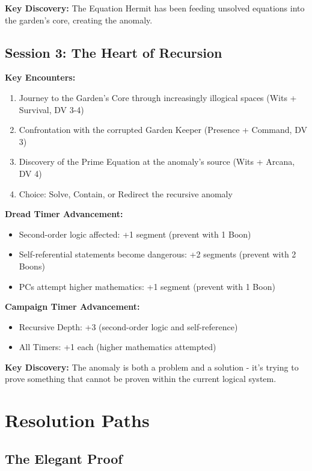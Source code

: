 \documentclass[11pt]{article}
\begin{document}
\textbf{Key Discovery:} The Equation Hermit has been feeding unsolved equations into the garden's core, creating the anomaly.

\subsection{Session 3: The Heart of Recursion}

\textbf{Key Encounters:}
\begin{enumerate}
\item Journey to the Garden's Core through increasingly illogical spaces (Wits + Survival, DV 3-4)
\item Confrontation with the corrupted Garden Keeper (Presence + Command, DV 3)
\item Discovery of the Prime Equation at the anomaly's source (Wits + Arcana, DV 4)
\item Choice: Solve, Contain, or Redirect the recursive anomaly
\end{enumerate}

\textbf{Dread Timer Advancement:}
\begin{itemize}
\item Second-order logic affected: +1 segment (prevent with 1 Boon)
\item Self-referential statements become dangerous: +2 segments (prevent with 2 Boons)
\item PCs attempt higher mathematics: +1 segment (prevent with 1 Boon)
\end{itemize}

\textbf{Campaign Timer Advancement:}
\begin{itemize}
\item Recursive Depth: +3 (second-order logic and self-reference)
\item All Timers: +1 each (higher mathematics attempted)
\end{itemize}

\textbf{Key Discovery:} The anomaly is both a problem and a solution - it's trying to prove something that cannot be proven within the current logical system.

\section{Resolution Paths}

\subsection{The Elegant Proof}
\end{document}
